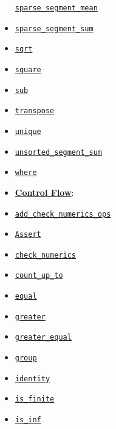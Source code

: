 \begin{itemize}
  \href{../../api_docs/python/math_ops.md\#sparse_segment_mean}{\texttt{sparse\_segment\_mean}}
\item
  \href{../../api_docs/python/math_ops.md\#sparse_segment_sum}{\texttt{sparse\_segment\_sum}}
\item
  \href{../../api_docs/python/math_ops.md\#sqrt}{\texttt{sqrt}}
\item
  \href{../../api_docs/python/math_ops.md\#square}{\texttt{square}}
\item
  \href{../../api_docs/python/math_ops.md\#sub}{\texttt{sub}}
\item
  \href{../../api_docs/python/math_ops.md\#transpose}{\texttt{transpose}}
\item
  \href{../../api_docs/python/math_ops.md\#unique}{\texttt{unique}}
\item
  \href{../../api_docs/python/math_ops.md\#unsorted_segment_sum}{\texttt{unsorted\_segment\_sum}}
\item
  \href{../../api_docs/python/math_ops.md\#where}{\texttt{where}}
\item
  \textbf{\href{../../api_docs/python/control_flow_ops.md}{Control
  Flow}}:
\item
  \href{../../api_docs/python/control_flow_ops.md\#add_check_numerics_ops}{\texttt{add\_check\_numerics\_ops}}
\item
  \href{../../api_docs/python/control_flow_ops.md\#Assert}{\texttt{Assert}}
\item
  \href{../../api_docs/python/control_flow_ops.md\#check_numerics}{\texttt{check\_numerics}}
\item
  \href{../../api_docs/python/control_flow_ops.md\#count_up_to}{\texttt{count\_up\_to}}
\item
  \href{../../api_docs/python/control_flow_ops.md\#equal}{\texttt{equal}}
\item
  \href{../../api_docs/python/control_flow_ops.md\#greater}{\texttt{greater}}
\item
  \href{../../api_docs/python/control_flow_ops.md\#greater_equal}{\texttt{greater\_equal}}
\item
  \href{../../api_docs/python/control_flow_ops.md\#group}{\texttt{group}}
\item
  \href{../../api_docs/python/control_flow_ops.md\#identity}{\texttt{identity}}
\item
  \href{../../api_docs/python/control_flow_ops.md\#is_finite}{\texttt{is\_finite}}
\item
  \href{../../api_docs/python/control_flow_ops.md\#is_inf}{\texttt{is\_inf}}

\end{itemize}
